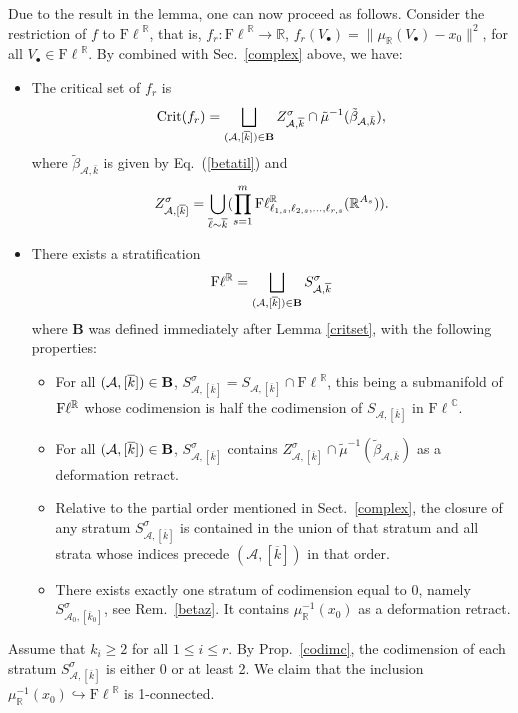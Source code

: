 \documentclass[12pt]{amsart}
\theoremstyle{definition}
\theoremstyle{remark}
\newcommand{\RR}{\mathbb R}
\newcommand{\CC}{\mathbb C}
\newcommand{\vk}{\overline{k}}
\newcommand{\A}{{\mathcal A}}
\newcommand{\Fl}{{\mathrm{F\ell}}}
\begin{document}
Due to the result in the lemma, one can now proceed as follows. Consider the restriction of $f$ to $\Fl^\RR$, that is, $f_r:  \Fl^\RR \to \RR$, $f_r(V_\bullet) = \|\mu_\RR(V_\bullet) - x_0\|^2$, for all
$V_\bullet \in \Fl^\RR$. By  \cite[Prop.~3]{BaHe} combined with Sec.~\ref{complex} above, we have:
\begin{itemize}
\item[(a)] The critical set of $f_r$ is  
$${\rm Crit}(f_r) = \bigsqcup_{(\A,[\vk])\in {\bf B}} Z^\sigma_{{\mathcal A}, \vk}\cap \tilde{\mu}^{-1}(\tilde{\beta}_{{\mathcal A}, \bar{k}}),$$
where  $\tilde{\beta}_{{\mathcal A}, \bar{k}}$ is given by Eq.~(\ref{betatil})  and
 $$Z^\sigma_{{\A,[\overline{k}]}}= \bigcup_{\overline{\ell}\sim\vk}( \prod_{s=1}^m {\rm F}\ell^\RR_{\ell_{1,s}, \ell_{2,s}, \ldots, \ell_{r,s}}(\RR^{A_s})).$$ 
\item[(b)] There exists a stratification
 $${\rm F}\ell^\RR = \bigsqcup_{(\A, [\vk]) \in {\bf B}}S^\sigma_{\A, \vk}$$
 where {\bf B} was defined immediately after Lemma \ref{critset},  with the following properties:
 \begin{itemize}
 \item[$\bullet$]  For all $(\A, [\vk]) \in {\bf B}$, $S^\sigma_{\A, [\vk]}= S_{\A, [\vk]} \cap \Fl^\RR$, this being a submanifold of ${\rm F} \ell^\RR$ whose codimension is half the codimension of $S_{\A, [\vk]}$ in $\Fl^\CC$.  
\item[$\bullet$] For all $(\A, [\vk]) \in {\bf B}$, $S^\sigma_{\A, [\vk]}$ contains $Z^\sigma_{{\A,[\overline{k}]}} \cap \tilde{\mu}^{-1}(\tilde{\beta}_{\A,\overline{k}})$ as a deformation retract.
 \item[$\bullet$] Relative to the partial order mentioned in Sect.~\ref{complex},  the closure of any  stratum $S^\sigma_{\A, [\vk]}$   is contained in the union of that stratum and all strata whose indices precede $(\A, [\vk])$ in that order. 
 \item[$\bullet$] There exists exactly one stratum of  codimension equal to 0, namely $S^\sigma_{\A_0, [\vk_0]}$, see Rem.~\ref{betaz}.  It contains $\mu_\RR^{-1}(x_0)$ as a deformation retract. 
 \end{itemize}
\end{itemize}

Assume that $k_i\ge 2$ for all $1\le i\le r$. By Prop.~\ref{codimc}, the codimension of each stratum $S^\sigma_{\A,[\vk]}$ is either 0 or at least 2. We claim that the inclusion
$
\mu_\RR^{-1}(x_0)\hookrightarrow \Fl^\RR
$
is 1-connected.
\end{document}

